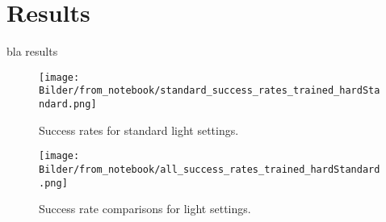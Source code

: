 \chapter{Results}
\label{cha:Reults}

bla results



\begin{figure}
    \centering
    \texttt{[image: Bilder/from\_notebook/standard\_success\_rates\_trained\_hardStandard.png]}
    \caption{Success rates for standard light settings.}
    \label{fig:result_success_rates_standard}
\end{figure} %


\begin{figure}
    \centering
    \texttt{[image: Bilder/from\_notebook/all\_success\_rates\_trained\_hardStandard.png]}
    \caption{Success rate comparisons for light settings.}
    \label{fig:result_success_rates_lightSettings}
\end{figure} %